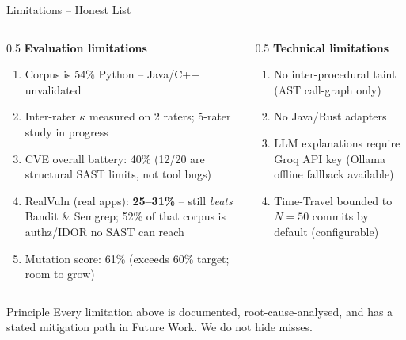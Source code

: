 \documentclass[aspectratio=169,12pt]{beamer}
\newcommand{\good}[1]{\textbf{\color{acrGreen}#1}}
\begin{document}
\begin{frame}{Limitations -- Honest List}
  \begin{columns}[T]
    \begin{column}{0.5\textwidth}
      \textbf{Evaluation limitations}
      \begin{enumerate}\small
        \item Corpus is 54\% Python -- Java/C++ unvalidated
        \item Inter-rater $\kappa$ measured on 2 raters; 5-rater study in progress
        \item CVE overall battery: 40\% (12/20 are structural SAST limits, not tool bugs)
        \item RealVuln (real apps): \good{25--31\%} -- still \emph{beats} Bandit \& Semgrep; 52\% of that corpus is authz/IDOR no SAST can reach
        \item Mutation score: 61\% (exceeds 60\% target; room to grow)
      \end{enumerate}
    \end{column}
    \begin{column}{0.5\textwidth}
      \textbf{Technical limitations}
      \begin{enumerate}\small
        \item No inter-procedural taint (AST call-graph only)
        \item No Java/Rust adapters
        \item LLM explanations require Groq API key (Ollama offline fallback available)
        \item Time-Travel bounded to $N=50$ commits by default (configurable)
      \end{enumerate}
    \end{column}
  \end{columns}
  \vspace{4pt}
  \begin{alertblock}{Principle}
    Every limitation above is documented, root-cause-analysed, and has a
    stated mitigation path in Future Work. We do not hide misses.
  \end{alertblock}
\end{frame}
\end{document}
